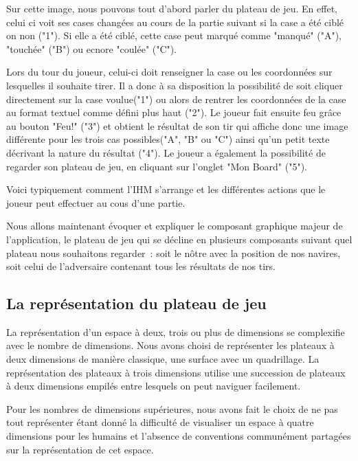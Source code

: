 	Sur cette image, nous pouvons tout d'abord parler du plateau de jeu. En effet, celui ci voit ses cases changées au cours de la partie suivant si la case a été ciblé on non ("1"). Si elle a été ciblé, cette case peut marqué comme "manqué" ("A"), "touchée" ("B") ou ecnore "coulée" ("C").
	\newline
	
	Lors du tour du joueur, celui-ci doit renseigner la case ou les coordonnées sur lesquelles il souhaite tirer. Il a donc à sa disposition la possibilité de soit cliquer directement sur la case voulue("1") ou alors de rentrer les coordonnées de la case au format textuel comme défini plus haut ("2"). Le joueur fait ensuite feu grâce au bouton "Feu!" ("3") et obtient le résultat de son tir qui affiche donc une image différente pour les trois cas possibles("A", "B" ou "C") ainsi qu'un petit texte décrivant la nature du résultat ("4"). Le joueur a également la possibilité de regarder son plateau de jeu, en cliquant sur l'onglet "Mon Board" ("5").
\newline

	Voici typiquement comment l'IHM s'arrange et les différentes actions que le joueur peut effectuer au cous d'une partie. 
	 \newline
	  
	Nous allons maintenant évoquer et expliquer le composant graphique majeur de l'application, le plateau de jeu qui se décline en plusieurs composants suivant quel plateau nous souhaitons regarder~: soit le nôtre avec la position de nos navires, soit celui de l'adversaire contenant tous les résultats de nos tirs.

\subsection{La représentation du plateau de jeu}
	La représentation d'un espace à deux, trois ou plus de dimensions se complexifie avec le nombre de dimensions.
Nous avons choisi de représenter les plateaux à deux dimensions de manière classique, une surface avec un quadrillage. La représentation des plateaux à trois dimensions utilise une succession de plateaux à deux dimensions empilés entre lesquels on peut naviguer facilement. \newline

	Pour les nombres de dimensions supérieures, nous avons fait le choix de ne pas tout représenter étant donné la difficulté de visualiser un espace à quatre dimensions pour les humains et l'absence de conventions communément partagées sur la représentation de cet espace.

